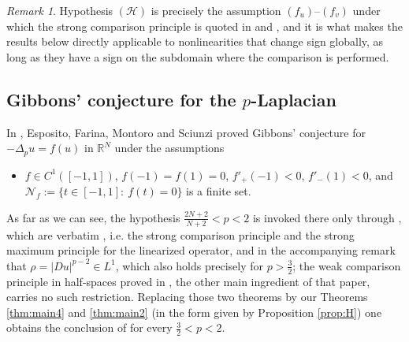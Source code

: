 \documentclass[reqno]{amsart}
\theoremstyle{plain}
\theoremstyle{definition}
\theoremstyle{remark}
\newtheorem{remark}[theorem]{Remark}
\newcommand{\R}{\mathbb{R}}
\begin{document}
\begin{remark}
Hypothesis $(\mathcal H)$ is precisely the assumption $(f_u)$--$(f_v)$ under which the strong
comparison principle is quoted in \cite[Theorem 2.4]{EFMS1} and \cite[Theorem 2.2]{EFMS2}, and it is
what makes the results below directly applicable to nonlinearities that change sign globally, as
long as they have a sign on the subdomain where the comparison is performed.
\end{remark}

\subsection{Gibbons' conjecture for the \texorpdfstring{$p$}{p}-Laplacian}
In \cite{EFMS1}, Esposito, Farina, Montoro and Sciunzi proved Gibbons' conjecture for
$-\Delta_pu=f(u)$ in $\R^N$ under the assumptions
\begin{itemize}[leftmargin=2.6em]
\item[$(h_f)$] $f\in C^1([-1,1])$, $f(-1)=f(1)=0$, $f'_+(-1)<0$, $f'_-(1)<0$, and
$\mathcal N_f:=\{t\in[-1,1]:\ f(t)=0\}$ is a finite set.
\end{itemize}
As far as we can see, the hypothesis $\frac{2N+2}{N+2}<p<2$ is invoked there only through
\cite[Theorems 2.4 and 2.6]{EFMS1}, which are verbatim \cite[Theorems 1.4 and 1.2]{DS2}, i.e. the
strong comparison principle and the strong maximum principle for the linearized operator, and in
the accompanying remark that $\rho=|Du|^{p-2}\in L^1$, which also holds precisely for
$p>\frac32$; the weak comparison principle in half-spaces proved in \cite[\S3]{EFMS1}, the other
main ingredient of that paper, carries no such restriction. Replacing those two theorems by our
Theorems \ref{thm:main4} and \ref{thm:main2} (in the form given by Proposition \ref{prop:H}) one
obtains the conclusion of \cite[Theorem 1.1]{EFMS1} for every $\frac32<p<2$.
\end{document}
